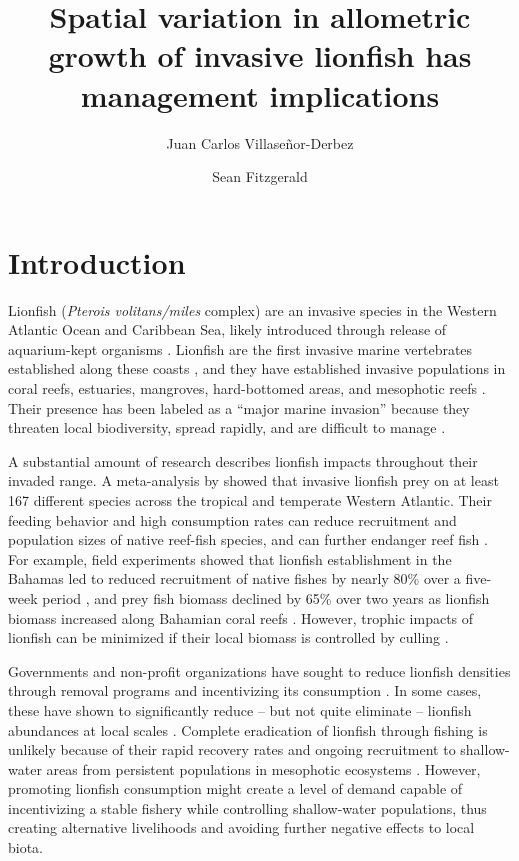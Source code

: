 \documentclass[fleqn,10pt,lineno]{wlpeerj} %
\title{Spatial variation in allometric growth of invasive lionfish has
management implications}
\author[1]{Juan Carlos Villaseñor-Derbez}
\author[1]{Sean Fitzgerald}
\affil[1]{Bren School of Environmental Sciences and Management, University of California
  Santa Barbara, Santa Barbara, California, USA}
\begin{document}
\flushbottom
\maketitle
\thispagestyle{empty}

\section*{Introduction}

Lionfish (\emph{Pterois volitans/miles} complex) are an invasive species
in the Western Atlantic Ocean and Caribbean Sea, likely introduced
through release of aquarium-kept organisms \citep{betancurr_2011}.
Lionfish are the first invasive marine vertebrates established along
these coasts \citep{schofield_2009,schofield_2010,sabidoitza_2016}, and
they have established invasive populations in coral reefs, estuaries,
mangroves, hard-bottomed areas, and mesophotic reefs
\citep{barbour_2010,jud_2011,muoz_2011,claydon_2012,andradibrown_2017,gress_2017}.
Their presence has been labeled as a ``major marine invasion'' because
they threaten local biodiversity, spread rapidly, and are difficult to
manage \citep{hixon_2016}.

A substantial amount of research describes lionfish impacts throughout
their invaded range. A meta-analysis by \citet{peake_2018} showed that
invasive lionfish prey on at least 167 different species across the
tropical and temperate Western Atlantic. Their feeding behavior and high
consumption rates can reduce recruitment and population sizes of native
reef-fish species, and can further endanger reef fish
\citep[][but see \citealt{hackerott_2017} for a counterexample]{green_2012,rocha_2015}.
For example, field experiments showed that lionfish establishment in the
Bahamas led to reduced recruitment of native fishes by nearly 80\% over
a five-week period \citep{albins_2008}, and prey fish biomass declined
by 65\% over two years as lionfish biomass increased along Bahamian
coral reefs \citep{green_2012}. However, trophic impacts of lionfish can
be minimized if their local biomass is controlled by culling
\citep{ariasgonzalez_2011}.

Governments and non-profit organizations have sought to reduce lionfish
densities through removal programs and incentivizing its consumption
\citep{chin_2016}. In some cases, these have shown to significantly
reduce -- but not quite eliminate -- lionfish abundances at local scales
\citep{deleon_2013,sandel_2015}. Complete eradication of lionfish
through fishing is unlikely because of their rapid recovery rates and
ongoing recruitment to shallow-water areas from persistent populations
in mesophotic ecosystems \citep{barbour_2011,andradibrown_2017}.
However, promoting lionfish consumption might create a level of demand
capable of incentivizing a stable fishery while controlling
shallow-water populations, thus creating alternative livelihoods and
avoiding further negative effects to local biota.
\end{document}
